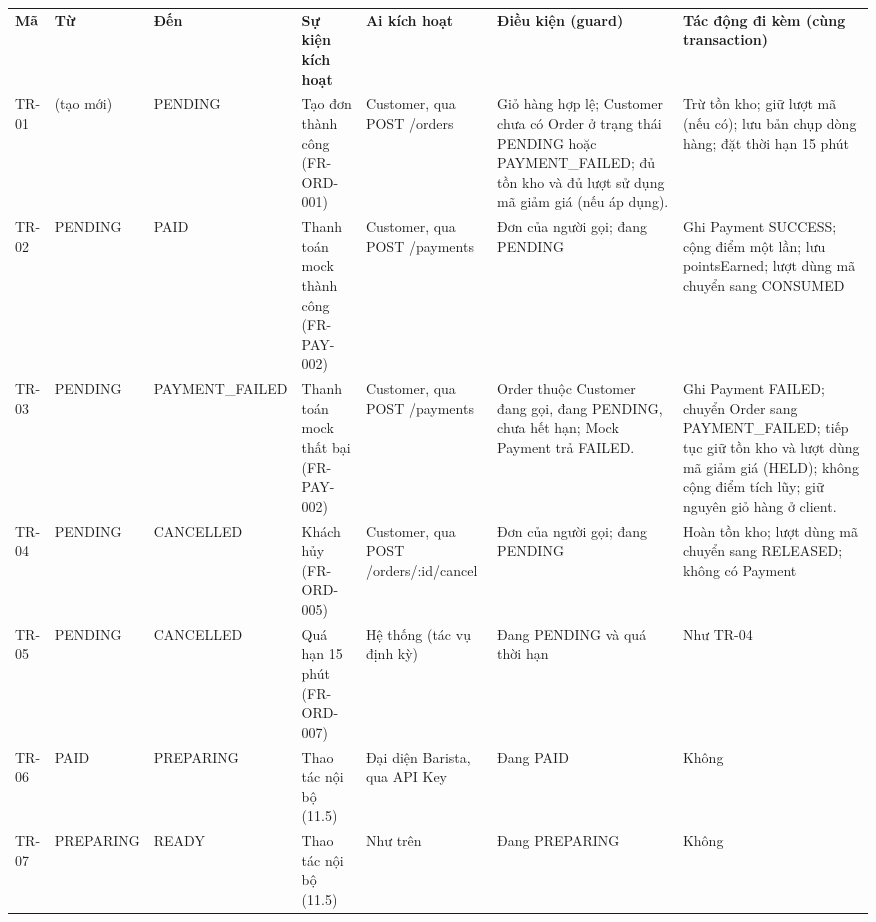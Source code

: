 \documentclass[11pt,a4paper,oneside]{report}
\begin{document}
\begin{landscape}
\begin{longtable}[]{@{}
  >{\raggedright\arraybackslash}p{}
  >{\raggedright\arraybackslash}p{}
  >{\raggedright\arraybackslash}p{}
  >{\raggedright\arraybackslash}p{}
  >{\raggedright\arraybackslash}p{}
  >{\raggedright\arraybackslash}p{}
  >{\raggedright\arraybackslash}p{}@{}}
\toprule\noalign{}
\endhead
\bottomrule\noalign{}
\endlastfoot
\textbf{Mã} & \textbf{Từ} & \textbf{Đến} & \textbf{Sự kiện kích hoạt} & \textbf{Ai kích hoạt} & \textbf{Điều kiện (guard)} & \textbf{Tác động đi kèm (cùng transaction)} \\
TR-01 & (tạo mới) & PENDING & Tạo đơn thành công (FR-ORD-001) & Customer, qua POST /orders & Giỏ hàng hợp lệ; Customer chưa có Order ở trạng thái PENDING hoặc PAYMENT\_FAILED; đủ tồn kho và đủ lượt sử dụng mã giảm giá (nếu áp dụng). & Trừ tồn kho; giữ lượt mã (nếu có); lưu bản chụp dòng hàng; đặt thời hạn 15 phút \\
TR-02 & PENDING & PAID & Thanh toán mock thành công (FR-PAY-002) & Customer, qua POST /payments & Đơn của người gọi; đang PENDING & Ghi Payment SUCCESS; cộng điểm một lần; lưu pointsEarned; lượt dùng mã chuyển sang CONSUMED \\
TR-03 & PENDING & PAYMENT\_FAILED & Thanh toán mock thất bại (FR-PAY-002) & Customer, qua POST /payments & Order thuộc Customer đang gọi, đang PENDING, chưa hết hạn; Mock Payment trả FAILED. & Ghi Payment FAILED; chuyển Order sang PAYMENT\_FAILED; tiếp tục giữ tồn kho và lượt dùng mã giảm giá (HELD); không cộng điểm tích lũy; giữ nguyên giỏ hàng ở client. \\
TR-04 & PENDING & CANCELLED & Khách hủy (FR-ORD-005) & Customer, qua POST /orders/:id/cancel & Đơn của người gọi; đang PENDING & Hoàn tồn kho; lượt dùng mã chuyển sang RELEASED; không có Payment \\
TR-05 & PENDING & CANCELLED & Quá hạn 15 phút (FR-ORD-007) & Hệ thống (tác vụ định kỳ) & Đang PENDING và quá thời hạn & Như TR-04 \\
TR-06 & PAID & PREPARING & Thao tác nội bộ (11.5) & Đại diện Barista, qua API Key & Đang PAID & Không \\
TR-07 & PREPARING & READY & Thao tác nội bộ (11.5) & Như trên & Đang PREPARING & Không \\

\end{longtable}
\end{landscape}
\end{document}
